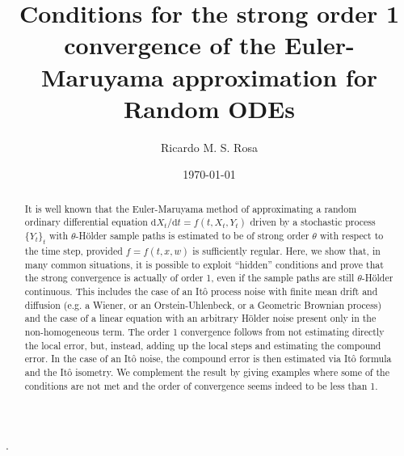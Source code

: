 \documentclass[reqno,12pt]{amsart}
\theoremstyle{plain}%
\theoremstyle{definition}
\begin{document}


\title[Strong order 1 convergence of Euler-Maruyama for Random ODEs]{Conditions for the strong order 1 convergence of the Euler-Maruyama approximation for Random ODEs}

\author[R. Rosa]{Ricardo M. S. Rosa}


\address[Ricardo M. S. Rosa]{Instituto de Matem\'atica, Universidade Federal do Rio de Janeiro, Brazil}


\date{\today}


.

\begin{abstract}
It is well known that the Euler-Maruyama method of approximating a random ordinary differential equation $\mathrm{d}X_t/\mathrm{d}t = f(t, X_t, Y_t)$ driven by a stochastic process $\{Y_t\}_t$ with $\theta$-H\"older sample paths is estimated to be of strong order $\theta$ with respect to the time step, provided $f=f(t, x, w)$ is sufficiently regular. Here, we show that, in many common situations, it is possible to exploit ``hidden'' conditions and prove that the strong convergence is actually of order 1, even if the sample paths are still $\theta$-H\"older continuous. This includes the case of an It\^o process noise with finite mean drift and diffusion (e.g. a Wiener, or an Orstein-Uhlenbeck, or a Geometric Brownian process) and the case of a linear equation with an arbitrary H\"older noise present only in the non-homogeneous term. The order 1 convergence follows from not estimating directly the local error, but, instead, adding up the local steps and estimating the compound error. In the case of an It\^o noise, the compound error is then estimated via It\^o formula and the It\^o isometry. We complement the result by giving examples where some of the conditions are not met and the order of convergence seems indeed to be less than 1.
\end{abstract}
\end{document}
